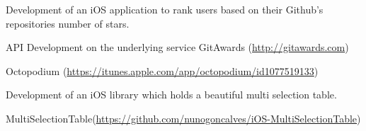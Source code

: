 

\begin{cventries}

  \cventry
    {\begin{cvitems} %
    		\item{Development of an iOS application to rank users based on their Github's repositories number of stars.}
    		\item {API Development on the underlying service GitAwards (\url{http://gitawards.com})}
    \end{cvitems}} %
    {Octopodium (\url{https://itunes.apple.com/app/octopodium/id1077519133}) } %
    {} %
    {} %
    {}

\cventry
{\begin{cvitems} %
		\item{Development of an iOS library which holds a beautiful multi selection table.}
\end{cvitems}} %
{MultiSelectionTable(\url{https://github.com/nunogoncalves/iOS-MultiSelectionTable})} %
{} %
{} %
{}

\end{cventries}
